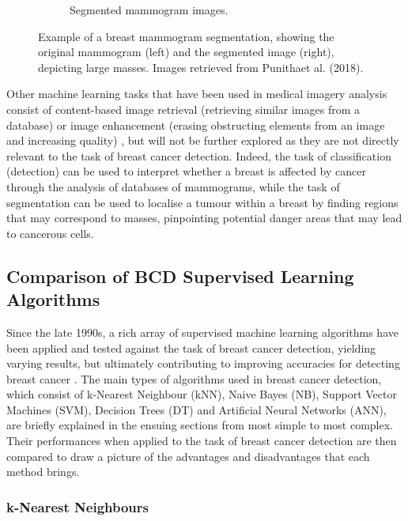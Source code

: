 \begin{figure}[h]
\begin{subfigure}{.5\textwidth}
  \caption{Segmented mammogram images.}
  \label{fig:segmented-mammogram}
\end{subfigure}
\caption{\label{fig:segmentation_example}Example of a breast mammogram segmentation, showing the original mammogram (left) and the segmented image (right), depicting large masses. Images retrieved from Punithaet al. (2018).}
\end{figure}

Other machine learning tasks that have been used in medical imagery analysis consist of content-based image retrieval (retrieving similar images from a database) or image enhancement (erasing obstructing elements from an image and increasing quality) \citep{Litjens2017}, but will not be further explored as they are not directly relevant to the task of breast cancer detection. Indeed, the task of classification (detection) can be used to interpret whether a breast is affected by cancer through the analysis of databases of mammograms, while the task of segmentation can be used to localise a tumour within a breast by finding regions that may correspond to masses, pinpointing potential danger areas that may lead to cancerous cells.

\subsection{Comparison of BCD Supervised Learning Algorithms}

Since the late 1990s, a rich array of supervised machine learning algorithms have been applied and tested against the task of breast cancer detection, yielding varying results, but ultimately contributing to improving accuracies for detecting breast cancer \citep{Yue2018}. The main types of algorithms used in breast cancer detection, which consist of k-Nearest Neighbour (kNN), Naive Bayes (NB), Support Vector Machines (SVM), Decision Trees (DT) and Artificial Neural Networks (ANN), are briefly explained in the ensuing sections from most simple to most complex. Their performances when applied to the task of breast cancer detection are then compared to draw a picture of the advantages and disadvantages that each method brings.

\subsubsection{k-Nearest Neighbours}
\label{sec:litreview-knn}

